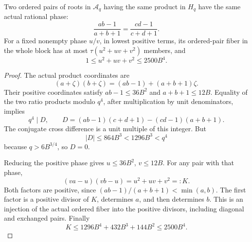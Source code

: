 \begin{lemma}
\label{mc-phase}
Two ordered pairs of roots in \(\mathcal{A}_q\) having the same product
in \(H_q\) have the same actual rational phase:
\[
 \frac{ab-1}{a+b+1}=\frac{cd-1}{c+d+1}.
\]
For a fixed nonempty phase \(u/v\), in lowest positive terms, its
ordered-pair fiber in the whole block has at most
\(\tau(u^2+uv+v^2)\) members, and
\[
 1\leq u^2+uv+v^2\leq2500B^4.
\]
\end{lemma}
\begin{proof}
The actual product coordinates are
\[
 (a+\zeta)(b+\zeta)=(ab-1)+(a+b+1)\zeta.
\]
Their positive coordinates satisfy \(ab-1\leq36B^2\) and
\(a+b+1\leq12B\). Equality of the two ratio products modulo
\(q^4\), after multiplication by unit denominators, implies
\[
 q^4\mid D,\qquad
 D=(ab-1)(c+d+1)-(cd-1)(a+b+1).
\]
The conjugate cross difference is a unit multiple of this integer.
But
\[
 |D|\leq864B^3<1296B^3<q^4
\]
because \(q>6B^{3/4}\), so \(D=0\).

Reducing the positive phase gives \(u\leq36B^2\), \(v\leq12B\).
For any pair with that phase,
\begin{equation}\label{mc-divisor-fiber}
 (va-u)(vb-u)=u^2+uv+v^2=:K.
\end{equation}
Both factors are positive, since
\((ab-1)/(a+b+1)<\min(a,b)\).
The first factor is a positive divisor of \(K\), determines \(a\),
and then determines \(b\). This is an injection of the actual
ordered fiber into the positive divisors, including diagonal and
exchanged pairs. Finally
\[
 K\leq1296B^4+432B^3+144B^2\leq2500B^4.
\]
\end{proof}

